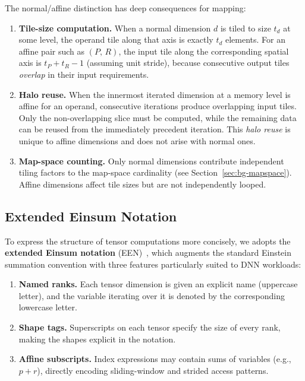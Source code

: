 The normal/affine distinction has deep consequences for mapping:
\begin{enumerate}
  \item \textbf{Tile-size computation.}
    When a normal dimension $d$ is tiled to size $t_d$ at some level, the
    operand tile along that axis is exactly $t_d$ elements.
    For an affine pair such as $(P,\,R)$, the input tile along the
    corresponding spatial axis is $t_P + t_R - 1$ (assuming unit stride),
    because consecutive output tiles \emph{overlap} in their input
    requirements.
  \item \textbf{Halo reuse.}
    When the innermost iterated dimension at a memory level is affine for
    an operand, consecutive iterations produce overlapping input tiles.
    Only the non-overlapping slice must be computed, while the remaining data can be reused from the  immediately precedent iteration.
    This \emph{halo reuse} is unique to affine dimensions and does not
    arise with normal ones.
  \item \textbf{Map-space counting.}
    Only normal dimensions contribute independent tiling factors to the
    map-space cardinality (see Section~\ref{sec:bg-mapspace}).
    Affine dimensions affect tile sizes but are not independently looped.
\end{enumerate}



\subsection{Extended Einsum Notation}
\label{sec:een}

To express the structure of tensor computations more concisely,
we adopts the \textbf{extended Einsum notation}
(EEN)~\cite{abdelfattah2016EEN}, which augments the standard Einstein
summation convention with three features particularly suited to DNN
workloads:
\begin{enumerate}
  \item \textbf{Named ranks.}
    Each tensor dimension is given an explicit name (uppercase letter),
    and the variable iterating over it is denoted by the corresponding
    lowercase letter.
  \item \textbf{Shape tags.}
    Superscripts on each tensor specify the size of every rank, making
    the shapes explicit in the notation.
  \item \textbf{Affine subscripts.}
    Index expressions may contain sums of variables (e.g., $p + r$),
    directly encoding sliding-window and strided access patterns.
\end{enumerate}

